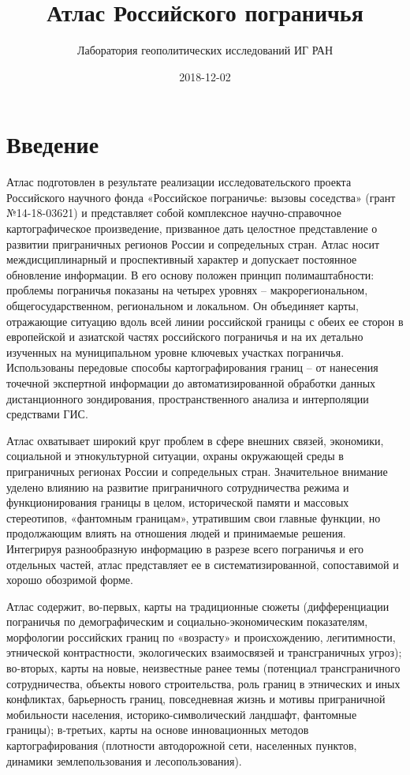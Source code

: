 \documentclass[]{book}
\title{Атлас Российского пограничья}
\author{Лаборатория геополитических исследований ИГ РАН}
\date{2018-12-02}
\begin{document}
\maketitle

{
\setcounter{tocdepth}{1}
\tableofcontents
}
\chapter*{Введение}

Атлас подготовлен в результате реализации исследовательского проекта
Российского научного фонда «Российское пограничье: вызовы соседства»
(грант №14-18-03621) и представляет собой комплексное научно-справочное
картографическое произведение, призванное дать целостное представление о
развитии приграничных регионов России и сопредельных стран. Атлас носит
междисциплинарный и проспективный характер и допускает постоянное
обновление информации. В его основу положен принцип полимаштабности:
проблемы пограничья показаны на четырех уровнях -- макрорегиональном,
общегосударственном, региональном и локальном. Он объединяет карты,
отражающие ситуацию вдоль всей линии российской границы с обеих ее
сторон в европейской и азиатской частях российского пограничья и на их
детально изученных на муниципальном уровне ключевых участках пограничья.
Использованы передовые способы картографирования границ -- от нанесения
точечной экспертной информации до автоматизированной обработки данных
дистанционного зондирования, пространственного анализа и интерполяции
средствами ГИС.

Атлас охватывает широкий круг проблем в сфере внешних связей, экономики,
социальной и этнокультурной ситуации, охраны окружающей среды в
приграничных регионах России и сопредельных стран. Значительное внимание
уделено влиянию на развитие приграничного сотрудничества режима и
функционирования границы в целом, исторической памяти и массовых
стереотипов, «фантомным границам», утратившим свои главные функции, но
продолжающим влиять на отношения людей и принимаемые решения. Интегрируя
разнообразную информацию в разрезе всего пограничья и его отдельных
частей, атлас представляет ее в систематизированной, сопоставимой и
хорошо обозримой форме.

Атлас содержит, во-первых, карты на традиционные сюжеты (дифференциации
пограничья по демографическим и социально-экономическим показателям,
морфологии российских границ по «возрасту» и происхождению,
легитимности, этнической контрастности, экологических взаимосвязей и
трансграничных угроз); во-вторых, карты на новые, неизвестные ранее темы
(потенциал трансграничного сотрудничества, объекты нового строительства,
роль границ в этнических и иных конфликтах, барьерность границ,
повседневная жизнь и мотивы приграничной мобильности населения,
историко-символический ландшафт, фантомные границы); в-третьих, карты на
основе инновационных методов картографирования (плотности автодорожной
сети, населенных пунктов, динамики землепользования и лесопользования).
\end{document}
